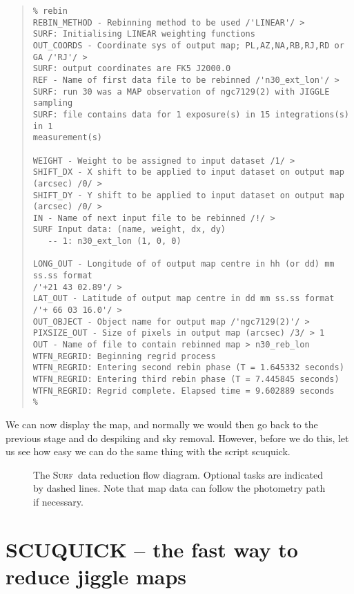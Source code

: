 \documentclass[twoside,11pt]{article}
\newenvironment{myquote}{\begin{quote}\begin{small}}{\end{small}\end{quote}}
\newcommand{\surf}{\xref{\textsc{Surf}}{sun216}{}}
\newcommand{\task}[1]{\textsf{#1}}
\newcommand{\scuquick}{\xref{\task{scuquick}}{sun216}{SCUQUICK}}
\newcommand{\htmlimage}[1]{}
\newcommand{\xref}[3]{#1}
\newcommand{\xlabel}[1]{}
\begin{document}
\begin{myquote} \begin{verbatim}
% rebin
REBIN_METHOD - Rebinning method to be used /'LINEAR'/ > 
SURF: Initialising LINEAR weighting functions
OUT_COORDS - Coordinate sys of output map; PL,AZ,NA,RB,RJ,RD or GA /'RJ'/ > 
SURF: output coordinates are FK5 J2000.0
REF - Name of first data file to be rebinned /'n30_ext_lon'/ > 
SURF: run 30 was a MAP observation of ngc7129(2) with JIGGLE sampling
SURF: file contains data for 1 exposure(s) in 15 integrations(s) in 1
measurement(s)
 
WEIGHT - Weight to be assigned to input dataset /1/ > 
SHIFT_DX - X shift to be applied to input dataset on output map (arcsec) /0/ > 
SHIFT_DY - Y shift to be applied to input dataset on output map (arcsec) /0/ > 
IN - Name of next input file to be rebinned /!/ > 
SURF Input data: (name, weight, dx, dy)
   -- 1: n30_ext_lon (1, 0, 0)
 
LONG_OUT - Longitude of of output map centre in hh (or dd) mm ss.ss format 
/'+21 43 02.89'/ > 
LAT_OUT - Latitude of output map centre in dd mm ss.ss format 
/'+ 66 03 16.0'/ > 
OUT_OBJECT - Object name for output map /'ngc7129(2)'/ > 
PIXSIZE_OUT - Size of pixels in output map (arcsec) /3/ > 1
OUT - Name of file to contain rebinned map > n30_reb_lon
WTFN_REGRID: Beginning regrid process
WTFN_REGRID: Entering second rebin phase (T = 1.645332 seconds)
WTFN_REGRID: Entering third rebin phase (T = 7.445845 seconds)
WTFN_REGRID: Regrid complete. Elapsed time = 9.602889 seconds
% 
\end{verbatim} \end{myquote}

We can now display the map, and normally we would then go back to the previous
stage and do despiking and sky removal. However, before we do this, let us see
how easy we can do the same thing with the script \scuquick. 

\begin{figure}
\htmlimage{scale=0.9}
\caption{The \surf\ data reduction flow diagram. Optional tasks are
indicated by dashed lines. Note that map data can follow the photometry
path if necessary.}
\label{flowdiag}
\end{figure}


\section{\xlabel{scuqquick_--_the_fastest_way_to_reduce_jiggle_maps}SCUQUICK -- the fast way to reduce jiggle maps}
\end{document}
